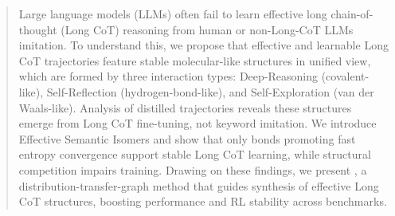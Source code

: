 \begin{abstract}{}
    Large language models (LLMs) often fail to learn effective long chain-of-thought (Long CoT) reasoning from human or non-Long-CoT LLMs imitation. To understand this, we propose that effective and learnable Long CoT trajectories feature stable molecular-like structures in unified view, which are formed by three interaction types: Deep-Reasoning (covalent-like), Self-Reflection (hydrogen-bond-like), and Self-Exploration (van der Waals-like). Analysis of distilled trajectories reveals these structures emerge from Long CoT fine-tuning, not keyword imitation. We introduce Effective Semantic Isomers and show that only bonds promoting fast entropy convergence support stable Long CoT learning, while structural competition impairs training. Drawing on these findings, we present \method, a distribution-transfer-graph method that guides synthesis of effective Long CoT structures, boosting performance and RL stability across benchmarks.
\end{abstract}